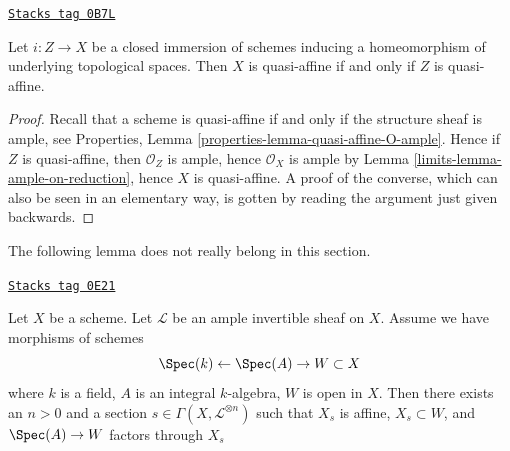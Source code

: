 \begin{lemma}
\label{limits-lemma-thickening-quasi-affine}
\href{https://stacks.math.columbia.edu/tag/0B7L}{\texttt{Stacks tag 0B7L}}

Let $i : Z \to X$ be a closed immersion of schemes
inducing a homeomorphism of underlying topological spaces.
Then $X$ is quasi-affine if and only if $Z$ is quasi-affine.
\end{lemma}

\begin{proof}

Recall that a scheme is quasi-affine
if and only if the structure sheaf is ample, see
Properties, Lemma \ref{properties-lemma-quasi-affine-O-ample}.
Hence if $Z$ is quasi-affine, then $\mathcal{O}_Z$ is ample,
hence $\mathcal{O}_X$ is ample by
Lemma \ref{limits-lemma-ample-on-reduction}, hence
$X$ is quasi-affine. A proof of the converse, which
can also be seen in an elementary way, is gotten by
reading the argument just given backwards.
\end{proof}

The following lemma does not really belong in this section.

\begin{lemma}
\label{limits-lemma-ample-profinite-set-in-principal-affine}
\href{https://stacks.math.columbia.edu/tag/0E21}{\texttt{Stacks tag 0E21}}

Let $X$ be a scheme. Let $\mathcal{L}$ be an ample invertible sheaf on $X$.
Assume we have morphisms of schemes
$$
\Spec(k) \leftarrow \Spec(A) \to W \subset X
$$
where $k$ is a field, $A$ is an integral $k$-algebra, $W$ is open in $X$.
Then there exists an $n > 0$ and a section
$s \in \Gamma(X, \mathcal{L}^{\otimes n})$ such that
$X_s$ is affine, $X_s \subset W$, and $\Spec(A) \to W$ factors through $X_s$
\end{lemma}

